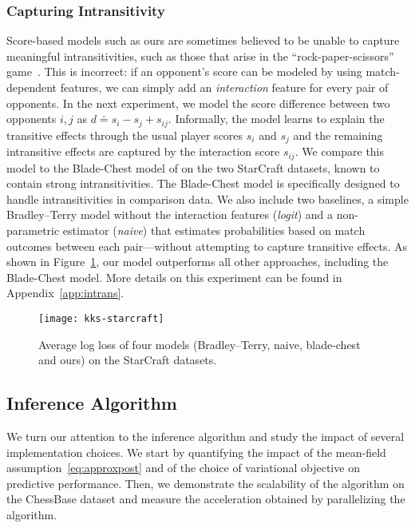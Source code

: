 \subsubsection{Capturing Intransitivity} \label{sec:eval-intrans}
Score-based models such as ours are sometimes believed to be unable to capture meaningful intransitivities, such as those that arise in the ``rock-paper-scissors'' game~\citep{chen2016modeling}.
This is incorrect: if an opponent's score can be modeled by using match-dependent features, we can simply add an \emph{interaction} feature for every pair of opponents.
In the next experiment, we model the score difference between two opponents $i, j$ as $d \doteq s_i - s_j + s_{ij}$.
Informally, the model learns to explain the transitive effects through the usual player scores $s_i$ and $s_j$ and the remaining intransitive effects are captured by the interaction score $s_{ij}$.
We compare this model to the Blade-Chest model of \citet{chen2016modeling} on the two StarCraft datasets, known to contain strong intransitivities.
The Blade-Chest model is specifically designed to handle intransitivities in comparison data.
We also include two baselines, a simple Bradley--Terry model without the interaction features (\emph{logit}) and a non-parametric estimator (\emph{naive}) that estimates probabilities based on match outcomes between each pair---without attempting to capture transitive effects.
As shown in Figure~\ref{fig:starcraft}, our model outperforms all other approaches, including the Blade-Chest model.
More details on this experiment can be found in Appendix~\ref{app:intrans}.

\begin{figure}[t]
	\texttt{[image: kks-starcraft]}
	\caption{
		Average log loss of four models (Bradley--Terry, naive, blade-chest and ours) on the StarCraft datasets.}
	\label{fig:starcraft}
\end{figure}


\subsection{Inference Algorithm}
\label{sec:evalinf}
We turn our attention to the inference algorithm and study the impact of several implementation choices.
We start by quantifying the impact of the mean-field assumption~\eqref{eq:approxpost} and of the choice of variational objective on predictive performance.
Then, we demonstrate the scalability of the algorithm on the ChessBase dataset and measure the acceleration obtained by parallelizing the algorithm.


